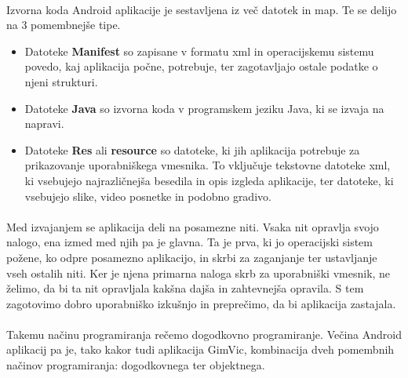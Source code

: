 \paragraph{}Izvorna koda Android aplikacije je sestavljena iz več datotek in map. Te se delijo na 3 pomembnejše tipe.
\begin{itemize}
  \setlength\itemsep{0em}
  \item Datoteke {\bf Manifest} so zapisane v formatu xml\cite{xml-wiki} in operacijskemu sistemu povedo, kaj aplikacija počne, potrebuje, ter zagotavljajo ostale podatke o njeni strukturi.
  \item Datoteke {\bf Java} so izvorna koda v programskem jeziku Java, ki se izvaja na napravi.
  \item Datoteke {\bf Res} ali {\bf resource} so datoteke, ki jih aplikacija potrebuje za prikazovanje uporabniškega vmesnika. To vključuje tekstovne datoteke xml, ki vsebujejo najrazličnejša besedila in opis izgleda aplikacije, ter datoteke, ki vsebujejo slike, video posnetke in podobno gradivo.
\end{itemize}

\paragraph{}Med izvajanjem se aplikacija deli na posamezne niti. Vsaka nit opravlja svojo nalogo, ena izmed med njih pa je glavna. Ta je prva, ki jo operacijski sistem požene, ko odpre posamezno aplikacijo, in skrbi za zaganjanje ter ustavljanje vseh ostalih niti. Ker je njena primarna naloga skrb za uporabniški vmesnik, ne želimo, da bi ta nit opravljala kakšna dajša in zahtevnejša opravila. S tem zagotovimo dobro uporabniško izkušnjo in preprečimo, da bi aplikacija zastajala.

\paragraph{}Takemu načinu programiranja rečemo dogodkovno programiranje\cite{event-programing-wiki}. Večina Android aplikacij pa je, tako kakor tudi aplikacija GimVic, kombinacija dveh pomembnih načinov programiranja: dogodkovnega ter objektnega\cite{object-programing-wiki}.
